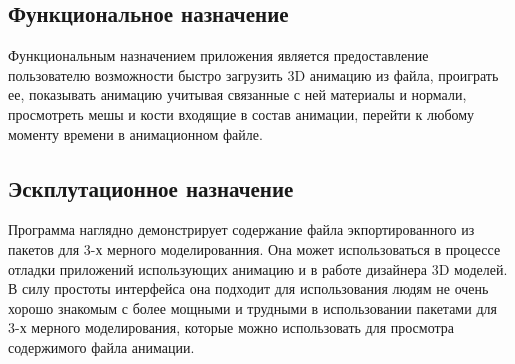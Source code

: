 \subsection{Функциональное назначение}
Функциональным назначением приложения является предоставление пользователю возможности быстро загрузить 3D анимацию из файла, проиграть ее, показывать анимацию учитывая связанные с ней материалы и нормали, просмотреть мешы и кости входящие в состав анимации, перейти к любому моменту времени в анимационном файле.

\subsection{Эскплутационное назначение}
Программа наглядно демонстрирует содержание файла экпортированного из пакетов для 3-х мерного моделированния. Она может использоваться в процессе отладки приложений использующих анимацию и в работе дизайнера 3D моделей. В силу простоты интерфейса она подходит для использования людям не очень хорошо знакомым с более мощными и трудными в использовании пакетами для 3-х мерного моделирования, которые можно использовать для просмотра содержимого файла анимации.
